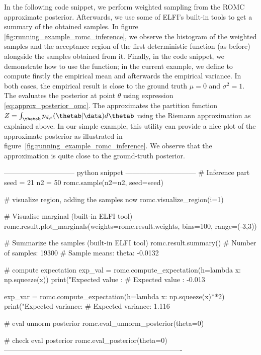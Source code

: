 In the following code snippet, we perform weighted sampling from the
ROMC approximate posterior. Afterwards, we use some of ELFI's
built-in tools to get a summary of the obtained samples. In figure
\ref{fig:running_example_romc_inference}, we observe the histogram of the weighted
samples and the acceptance region of the first deterministic function
(as before) alongside the samples obtained from it. Finally, in the
code snippet, we demonstrate how to use the 
function; in the current example, we define  to compute
firstly the empirical mean and afterwards the empirical variance. In
both cases, the empirical result is close to the ground truth
$\mu = 0$ and $\sigma^2 = 1$. The
 evaluates the posterior at
point $\theta$ using expression \eqref{eq:approx_posterior_omc}. The
 approximates the partition function
$Z = \int_{\thetab} p_{d,\epsilon}(\thetab|\data) d\thetab$ using the
Riemann approximation as explained above. In our simple example, this
utility can provide a nice plot of the approximate posterior as
illustrated in figure~\ref{fig:running_example_romc_inference}. We observe that the
approximation is quite close to the ground-truth posterior.

\begin{Code}
------------------------------ python snippet ------------------------------  
  # Inference part
  seed = 21
  n2 = 50
  romc.sample(n2=n2, seed=seed)

  # visualize region, adding the samples now
  romc.visualize_region(i=1)

  # Visualise marginal (built-in ELFI tool)
  romc.result.plot_marginals(weights=romc.result.weights,
                             bins=100, range=(-3,3))

  # Summarize the samples (built-in ELFI tool)
  romc.result.summary()
  # Number of samples: 19300
  # Sample means: theta: -0.0132

  # compute expectation
  exp_val = romc.compute_expectation(h=lambda x: np.squeeze(x))
  print("Expected value   : %
  # Expected value   : -0.013

  exp_var = romc.compute_expectation(h=lambda x: np.squeeze(x)**2)
  print("Expected variance: %
  # Expected variance: 1.116

  # eval unnorm posterior
  romc.eval_unnorm_posterior(theta=0)

  # check eval posterior
  romc.eval_posterior(theta=0)
----------------------------------------------------------------------------
\end{Code}

